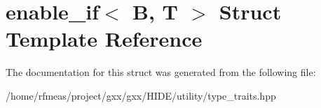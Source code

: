 \hypertarget{structenable__if}{}\section{enable\+\_\+if$<$ B, T $>$ Struct Template Reference}
\label{structenable__if}


The documentation for this struct was generated from the following file\+:\begin{DoxyCompactItemize}
\item 
/home/rfmeas/project/gxx/gxx/\+H\+I\+D\+E/utility/type\+\_\+traits.\+hpp\end{DoxyCompactItemize}
